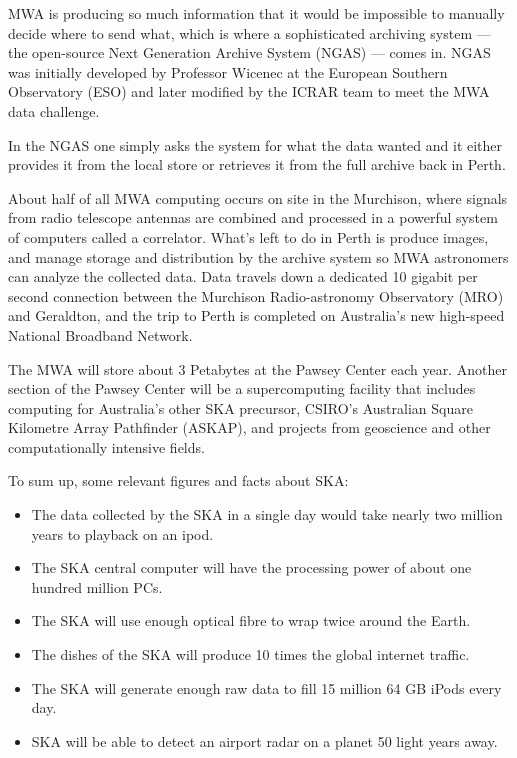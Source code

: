 MWA is producing so much information that it would be impossible to manually decide where to send what, which is where a sophisticated archiving system — the open-source Next Generation Archive System (NGAS) — comes in. NGAS was initially developed by Professor Wicenec at the European Southern Observatory (ESO) and later modified by the ICRAR team to meet the MWA data challenge. \newline

In the NGAS one simply asks the system for what the data wanted and it either provides it from the local store or retrieves it from the full archive back in Perth. \newline

About half of all MWA computing occurs on site in the Murchison, where signals from radio telescope antennas are combined and processed in a powerful system of computers called a correlator. What's left to do in Perth is produce images, and manage storage and distribution by the archive system so MWA astronomers can analyze the collected data. Data travels down a dedicated 10 gigabit per second connection between the Murchison Radio-astronomy Observatory (MRO) and Geraldton, and the trip to Perth is completed on Australia’s new high-speed National Broadband Network. \newline

The MWA will store about 3 Petabytes at the Pawsey Center each year. Another section of the Pawsey Center will be a supercomputing facility that includes computing for Australia's other SKA precursor, CSIRO’s Australian Square Kilometre Array Pathfinder (ASKAP), and projects from geoscience and other computationally intensive fields. \newline

To sum up, some relevant figures and facts about SKA:

\begin{itemize}

\item The data collected by the SKA in a single day would take nearly two million years to playback on an ipod.
\item The SKA central computer will have the processing power of about one hundred million PCs.
\item The SKA will use enough optical fibre to wrap twice around the Earth.
\item The dishes of the SKA will produce 10 times the global internet traffic.
\item The SKA will generate enough raw data to fill 15 million 64 GB iPods every day.
\item SKA will be able to detect an airport radar on a planet 50 light years away.

\end{itemize}



